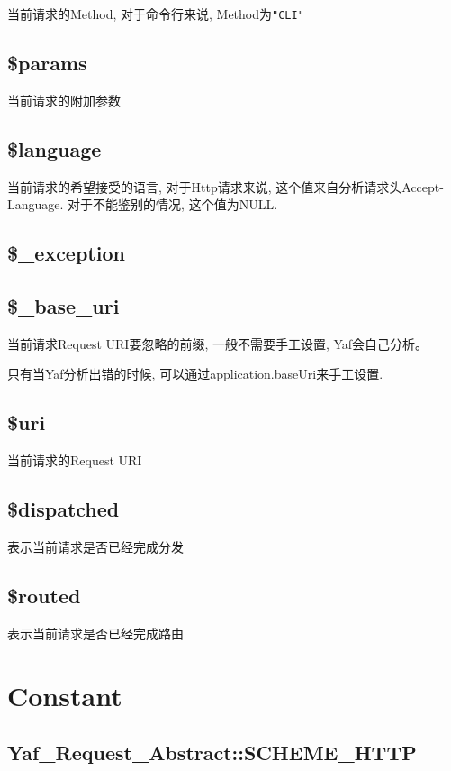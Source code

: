 当前请求的Method, 对于命令行来说, Method为\texttt{"CLI"}

\subsection{\$params}

当前请求的附加参数

\subsection{\$language}

当前请求的希望接受的语言, 对于Http请求来说, 这个值来自分析请求头Accept-Language. 对于不能鉴别的情况, 这个值为NULL.

\subsection{\$\_exception}
\subsection{\$\_base\_uri}

当前请求Request URI要忽略的前缀, 一般不需要手工设置, Yaf会自己分析。

只有当Yaf分析出错的时候, 可以通过application.baseUri来手工设置.

\subsection{\$uri}

当前请求的Request URI

\subsection{\$dispatched}

表示当前请求是否已经完成分发

\subsection{\$routed}

表示当前请求是否已经完成路由

\section{Constant}


\subsection{Yaf\_Request\_Abstract::SCHEME\_HTTP}


